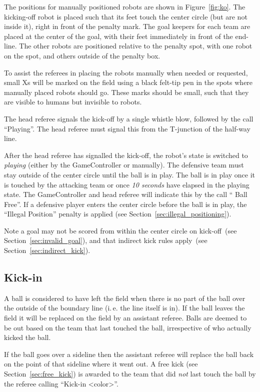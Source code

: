 \documentclass[12pt]{article}
\newcommand{\ie}{\mbox{i.\,e.}\xspace}
\newcommand{\cf}{see\xspace}
\newcommand{\KickOffBallFreeTime}{10 seconds\xspace}
\begin{document}
The positions for manually positioned robots are shown in Figure~\ref{fig:ko}. The kicking-off robot is placed such that its feet touch the center circle (but are not inside it), right in front of the penalty mark. The goal keepers for each team are placed at the center of the goal, with their feet immediately in front of the end-line.
The other robots are positioned relative to the penalty spot, with one robot on the spot, and others outside of the penalty box.

To assist the referees in placing the robots manually when needed or requested, small Xs will be marked on the field using a black felt-tip pen in the spots where manually placed robots should go.  These marks should be small, such that they are visible to humans but invisible to robots.

The head referee signals the kick-off by a single whistle blow, followed by the call ``Playing''. The head referee must signal this from the T-junction of the half-way line.

After the head referee has signalled the kick-off, the robot's state is switched to \emph{playing} (either by the GameController or manually).
The defensive team must stay outside of the center circle until the ball is in play.  The ball is in play once it is touched by the attacking team or once \emph{\KickOffBallFreeTime} have elapsed in the playing state.
The GameController and head referee will indicate this by the call `` Ball Free''.
If a defensive player enters the center circle before the ball is in play, the ``Illegal Position'' penalty is applied (\cf Section~\ref{sec:illegal_positioning}).

Note a goal may not be scored from within the center circle on kick-off~(\cf Section~\ref{sec:invalid_goal}), and that indirect kick rules apply~(\cf Section~\ref{sec:indirect_kick}).

\subsection{Kick-in}
\label{sec:kick_in}

A ball is considered to have left the field when there is no part of the ball over the outside of the boundary line (\ie the line itself is in). If the ball leaves the field it will be replaced on the field by an assistant referee. Balls are deemed to be out based on the team that last touched the ball, irrespective of who actually kicked the ball.

If the ball goes over a sideline then the assistant referee will replace the ball back on the point of that sideline where it went out. A free kick (\cf Section~\ref{sec:free_kick}) is awarded to the team that did \emph{not} last touch the ball by the referee calling ``Kick-in \textless color\textgreater''.
\end{document}
